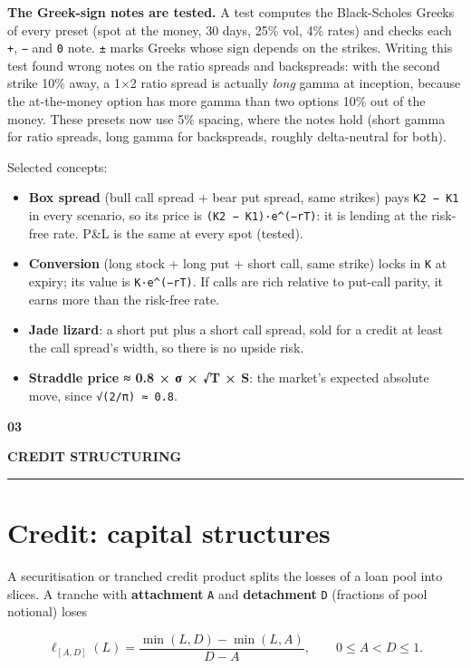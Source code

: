\documentclass[10pt,a4paper]{article}
\providecommand{\tightlist}{\setlength{\itemsep}{1pt}\setlength{\parskip}{0pt}}
\numberwithin{equation}{section}
\newcommand{\PartMarker}[2]{%
\clearpage
\phantomsection\addcontentsline{toc}{part}{#2}%
\vspace*{1mm}%
\noindent\begin{minipage}[t]{0.10\textwidth}
{\sffamily\Large\bfseries\color{Accent}#1}
\end{minipage}%
\begin{minipage}[t]{0.88\textwidth}
{\sffamily\small\bfseries\color{Muted}\MakeUppercase{#2}}\\[4pt]
\textcolor{Rule}{\rule{\linewidth}{0.8pt}}
\end{minipage}
\vspace{2mm}}
\begin{document}
\textbf{The Greek-sign notes are tested.} A test computes the Black-Scholes Greeks of every preset (spot at the money, 30 days, 25\% vol, 4\% rates) and checks each \texttt{+}, \texttt{−} and \texttt{0} note. \texttt{±} marks Greeks whose sign depends on the strikes. Writing this test found wrong notes on the ratio spreads and backspreads: with the second strike 10\% away, a 1×2 ratio spread is actually \emph{long} gamma at inception, because the at-the-money option has more gamma than two options 10\% out of the money. These presets now use 5\% spacing, where the notes hold (short gamma for ratio spreads, long gamma for backspreads, roughly delta-neutral for both).

Selected concepts:

\begin{itemize}
\tightlist
\item
  \textbf{Box spread} (bull call spread + bear put spread, same strikes) pays \texttt{K2\ −\ K1} in every scenario, so its price is \texttt{(K2\ −\ K1)·e\^{}(−rT)}: it is lending at the risk-free rate. P\&L is the same at every spot (tested).
\item
  \textbf{Conversion} (long stock + long put + short call, same strike) locks in \texttt{K} at expiry; its value is \texttt{K·e\^{}(−rT)}. If calls are rich relative to put-call parity, it earns more than the risk-free rate.
\item
  \textbf{Jade lizard}: a short put plus a short call spread, sold for a credit at least the call spread's width, so there is no upside risk.
\item
  \textbf{Straddle price ≈ 0.8 × σ × √T × S}: the market's expected absolute move, since \texttt{√(2/π)\ ≈\ 0.8}.
\end{itemize}

\PartMarker{03}{Credit structuring}

\section{Credit: capital structures}\label{credit-capital-structures}

A securitisation or tranched credit product splits the losses of a loan pool into slices. A tranche with \textbf{attachment} \texttt{A} and \textbf{detachment} \texttt{D} (fractions of pool notional) loses

\begin{equation}
\ell_{[A,D]}(L)=\frac{\min(L,D)-\min(L,A)}{D-A},\qquad 0\le A < D\le 1.
\end{equation}
\end{document}
